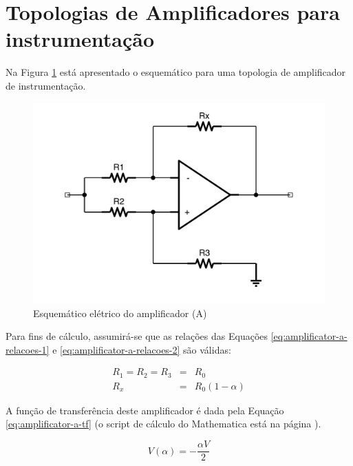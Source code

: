 \documentclass[a4paper]{instrumentacao}
\begin{document}
\section{Topologias de Amplificadores para instrumentação}


Na Figura \ref{fig:amplificador-a} está apresentado o esquemático para uma topologia de amplificador de instrumentação.

\begin{figure}[H]
\center
\includegraphics[width=\textwidth]{Amplificador-A.pdf}
\caption{Esquemático elétrico do amplificador (A)}
\label{fig:amplificador-a}
\end{figure}

Para fins de cálculo, assumirá-se que as relações das Equações \ref{eq:amplificator-a-relacoes-1} e \ref{eq:amplificator-a-relacoes-2} são válidas:

\begin{eqnarray}
	R_1 = R_2 = R_3 &=& R_0 \label{eq:amplificator-a-relacoes-1} \\
	R_x &=& R_0(1-\alpha) 	\label{eq:amplificator-a-relacoes-2} 
\end{eqnarray}

A função de transferência\cite{ti-amplificador} deste amplificador é dada pela Equação \ref{eq:amplificator-a-tf} (o script de cálculo do Mathematica está na página \pageref{att:amplificadores}).

\begin{equation}
	V(\alpha) = -\frac{\alpha  V}{2}
	\label{eq:amplificator-a-tf}
\end{equation}
\end{document}
